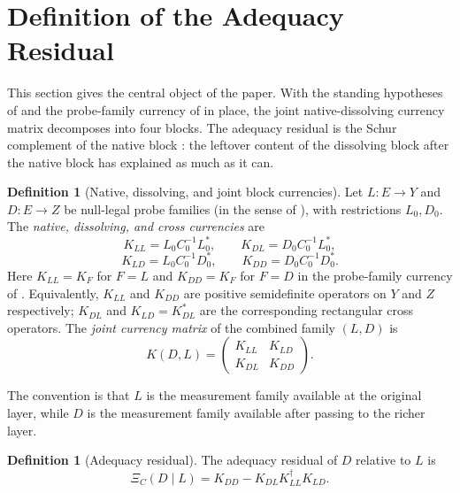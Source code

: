 \documentclass[11pt]{article}
\theoremstyle{definition}
\newtheorem{definition}[theorem]{Definition}
\begin{document}
 \section{Definition of the Adequacy Residual}
\label{sec:adequacy-residual}

This section gives the central object of the paper.  With the standing
hypotheses of  and the probe-family currency of
 in place, the joint native-dissolving currency matrix
decomposes into four blocks.  The adequacy residual is the Schur complement of
the native block
\citep{Schur1917Potenzreihen,Haynsworth1968Inertia,Albert1969PSDPartitioned,Cottle1974Manifestations,Zhang2005SchurApplications,HornJohnson2013MatrixAnalysis}:
the leftover content of the dissolving block after the native
block has explained as much as it can.

\begin{definition}[Native, dissolving, and joint block currencies]\label{def:xi:block-currencies}
Let \(L\colon E\to Y\) and \(D\colon E\to Z\) be null-legal probe families (in
the sense of ), with restrictions
\(L_0,D_0\).  The \emph{native, dissolving, and cross currencies} are
\[
  K_{LL}=L_0C_0^{-1}L_0^*,
  \qquad
  K_{DL}=D_0C_0^{-1}L_0^*,
\]
\[
  K_{LD}=L_0C_0^{-1}D_0^*,
  \qquad
  K_{DD}=D_0C_0^{-1}D_0^*.
\]
Here \(K_{LL}=K_F\) for \(F=L\) and \(K_{DD}=K_F\) for \(F=D\) in the
probe-family currency of .  Equivalently,
\(K_{LL}\) and \(K_{DD}\) are positive semidefinite operators on \(Y\) and
\(Z\) respectively; \(K_{DL}\) and \(K_{LD}=K_{DL}^*\) are the corresponding
rectangular cross operators.  The \emph{joint currency matrix} of the combined
family \((L,D)\) is
\[
  K(D,L)
  =
  \begin{pmatrix}
    K_{LL} & K_{LD} \\
    K_{DL} & K_{DD}
  \end{pmatrix}.
\]
\end{definition}

The convention is that \(L\) is the measurement family available at the
original layer, while \(D\) is the measurement family available after passing to
the richer layer.

\begin{definition}[Adequacy residual]\label{def:xi:adequacy-residual}
The adequacy residual of \(D\) relative to \(L\) is
\[
  \boxed{\Xi_C(D\mid L)=K_{DD}-K_{DL}K_{LL}^\dagger K_{LD}.}
\]
\end{definition}
\end{document}
